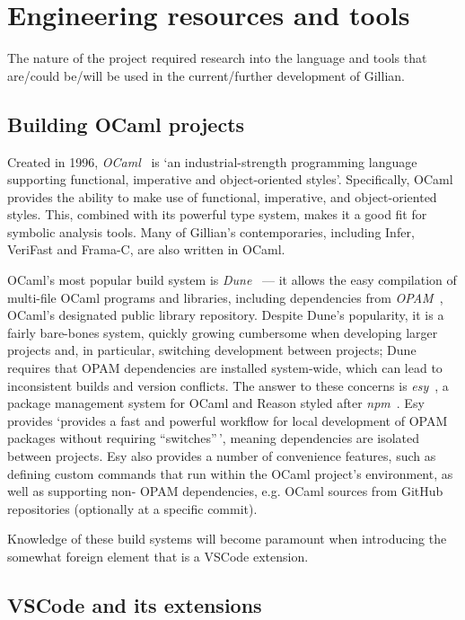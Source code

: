 \section{Engineering resources and tools}\label{sec:background:engineering-tools}

The nature of the project required research into the language and tools that
are/could be/will be used in the current/further development of Gillian.

\subsection{Building OCaml projects}

Created in 1996, \textit{OCaml}~\cite{ocaml} is `an industrial-strength
programming language supporting functional, imperative and object-oriented
styles'. Specifically, OCaml provides the ability to make use of functional,
imperative, and object-oriented styles. This, combined with its powerful type
system, makes it a good fit for symbolic analysis tools. Many of Gillian's
contemporaries, including Infer, VeriFast and Frama-C, are also written in
OCaml.

OCaml's most popular build system is \textit{Dune}~\cite{dune} --- it allows the
easy compilation of multi-file OCaml programs and libraries, including
dependencies from \textit{OPAM}~\cite{opam}, OCaml's designated public library
repository. Despite Dune's popularity, it is a fairly bare-bones system, quickly
growing cumbersome when developing larger projects and, in particular,
switching development between projects; Dune requires that OPAM dependencies
are installed system-wide, which can lead to inconsistent builds and version
conflicts. The answer to these concerns is \textit{esy}~\cite{esy}, a package
management system for OCaml and Reason styled after \textit{npm}~\cite{npm}.
Esy provides `provides a fast and powerful workflow for local development of
OPAM packages without requiring ``switches''\,', meaning dependencies are
isolated between projects. Esy also provides a number of convenience features,
such as defining custom commands that run within the OCaml project's
environment, as well as supporting non- OPAM dependencies, e.g. OCaml sources
from GitHub repositories (optionally at a specific commit).

Knowledge of these build systems will become paramount when introducing the
somewhat foreign element that is a VSCode extension.

\subsection{VSCode and its extensions}\label{sec:vscode}

